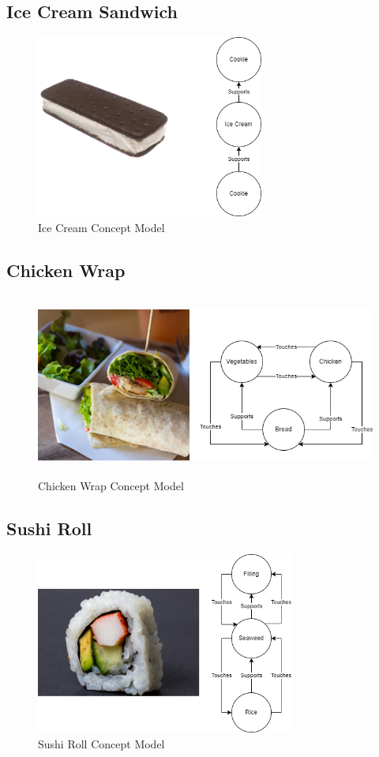 \subsection{Ice Cream Sandwich}
\label{appendix:ics}
\begin{figure}[H]
	\centering
	\includegraphics[height=6cm]{Figures/ice-cream-sandwich.png}
	\caption{Ice Cream Concept Model}
	\label{fig:icecream-sandwich}
\end{figure}


\subsection{Chicken Wrap}
\label{appendix:cw}
\begin{figure}[H]
	\centering
	\includegraphics[height=6cm]{Figures/chicken-wrap.png}
	\caption{Chicken Wrap Concept Model}
	\label{fig:cw}
\end{figure}

\subsection{Sushi Roll}
\label{appendix:sushi}
\begin{figure}[H]
	\centering
	\includegraphics[height=6cm]{Figures/sushi-roll.png}
	\caption{Sushi Roll Concept Model}
	\label{fig:sushi}
\end{figure}

